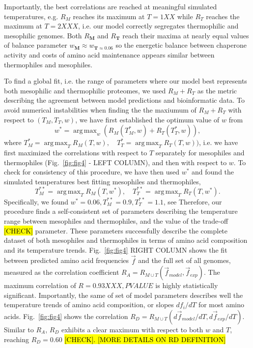 \documentclass[10pt,letterpaper]{article}
\DeclareMathOperator*{\argmax}{arg\,max}
\begin{document}


Importantly, the best correlations are reached at meaningful simulated temperatures, e.g. $R_M$ reaches its maximum at $T=1XX$ while $R_T$ reaches the maximum at $T=2XXX$, i.e. our model correctly segregates thermophilic and mesophilic genomes. 
Both $R_{\mathbf{M}}$ and $R_{\mathbf{T}}$ reach their maxima at nearly equal values of balance parameter $\mathit{w}_{\mathbf{M}}\approx \mathit{w}_{\mathbf{T} \approx 0.06}$ so the energetic balance between chaperone activity and costs of amino acid maintenance appears similar between thermophiles and mesophiles.

To find a global fit, i.e. the range of parameters where our model best represents both mesophilic and thermophilic proteomes, we used $R_M + R_T$ as the metric describing the agreement between model predictions and bioinformatic data. To avoid numerical instabilities when finding the the maxiumum of $R_M+R_T$ with respect to $(T_M, T_T, w)$, we have first established the optimum value of $w$ from
$$
w^* = \argmax_{w} (R_M(T_M^*, w) + R_T(T^*_T,w) ),
$$
where $T_M^*=\argmax_{T}R_M(T,w), \quad T_T^*=\argmax_{T}R_T(T,w))$, i.e. we have first maximized the correlations with respect to $T$ separately for mesophiles and thermophiles (Fig.~\ref{fig:fig4} - LEFT COLUMN), and then with respect to $w$. To check for consistency of this procedure, we have then used $w^*$ and found the simulated temperatures best fitting mesophiles and thermophiles, 
$$
T^{**}_M = \argmax_{T}R_M(T, w^*), \quad T^{**}_T = \argmax_{T}R_T(T, w^*).
$$
Specifically, we found $w^*=0.06,  T^{**}_M=0.9, T^{**}_T=1.1$, see   Therefore, our procedure finds a self-consistent set of parameters describing the temperature range between mesophiles and thermophiles, and the value of the trade-off \hl{[CHECK]} parameter. These parameters successfully describe the complete dataset of both mesophiles and thermophiles in terms of amino acid composition and its temperature trends. Fig.~\ref{fig:fig4} RIGHT COLUMN shows the fit between predicted amino acid frequencies $\vec f$ and the full set of all genomes, measured as the correlation coefficient $R_A = R_{M \cup T}(\vec f_{model}, \vec f_{exp})$. The maximum correlation of $R=0.93 XXX, PVALUE$ is highly statistically significant. Importantly, the same of set of model parameters describes well the temperature trends of amino acid composition, or slopes $df_i/dT$ for most amino acids. Fig.~\ref{fig:fig4} shows the correlation $R_D= R_{M\cup T}(d\vec f_{model}{/dT}, d\vec f_{exp}/dT)$. Similar to $R_A$, $R_D$ exhibits a clear maximum with respect to both $w$ and $T$, reaching $R_D=0.60$ \hl{[CHECK]. [MORE DETAILS ON RD DEFINITION]}
\end{document}
